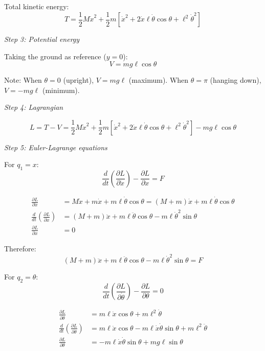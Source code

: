 \begin{example}
Total kinetic energy:
\begin{equation}
T = \frac{1}{2}M\dot{x}^2 + \frac{1}{2}m[\dot{x}^2 + 2\dot{x}\ell\dot{\theta}\cos\theta + \ell^2\dot{\theta}^2]
\end{equation}

\textit{Step 3: Potential energy}

Taking the ground as reference ($y=0$):
\begin{equation}
V = mg\ell\cos\theta
\end{equation}

Note: When $\theta = 0$ (upright), $V = mg\ell$ (maximum). When $\theta = \pi$ (hanging down), $V = -mg\ell$ (minimum).

\textit{Step 4: Lagrangian}

\begin{equation}
L = T - V = \frac{1}{2}M\dot{x}^2 + \frac{1}{2}m[\dot{x}^2 + 2\dot{x}\ell\dot{\theta}\cos\theta + \ell^2\dot{\theta}^2] - mg\ell\cos\theta
\end{equation}

\textit{Step 5: Euler-Lagrange equations}

For $q_1 = x$:
\begin{equation}
\frac{d}{dt}\left(\frac{\partial L}{\partial \dot{x}}\right) - \frac{\partial L}{\partial x} = F
\end{equation}

\begin{align}
\frac{\partial L}{\partial \dot{x}} &= M\dot{x} + m\dot{x} + m\ell\dot{\theta}\cos\theta = (M+m)\dot{x} + m\ell\dot{\theta}\cos\theta \\
\frac{d}{dt}\left(\frac{\partial L}{\partial \dot{x}}\right) &= (M+m)\ddot{x} + m\ell\ddot{\theta}\cos\theta - m\ell\dot{\theta}^2\sin\theta \\
\frac{\partial L}{\partial x} &= 0
\end{align}

Therefore:
\begin{equation}
(M+m)\ddot{x} + m\ell\ddot{\theta}\cos\theta - m\ell\dot{\theta}^2\sin\theta = F
\label{eq:pend_eq1_nonlinear}
\end{equation}

For $q_2 = \theta$:
\begin{equation}
\frac{d}{dt}\left(\frac{\partial L}{\partial \dot{\theta}}\right) - \frac{\partial L}{\partial \theta} = 0
\end{equation}

\begin{align}
\frac{\partial L}{\partial \dot{\theta}} &= m\ell\dot{x}\cos\theta + m\ell^2\dot{\theta} \\
\frac{d}{dt}\left(\frac{\partial L}{\partial \dot{\theta}}\right) &= m\ell\ddot{x}\cos\theta - m\ell\dot{x}\dot{\theta}\sin\theta + m\ell^2\ddot{\theta} \\
\frac{\partial L}{\partial \theta} &= -m\ell\dot{x}\dot{\theta}\sin\theta + mg\ell\sin\theta
\end{align}


\end{example}
